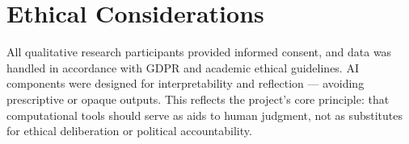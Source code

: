 \section{Ethical Considerations}

All qualitative research participants provided informed consent, and data was handled in accordance with GDPR and academic ethical guidelines. AI components were designed for interpretability and reflection — avoiding prescriptive or opaque outputs. This reflects the project's core principle: that computational tools should serve as aids to human judgment, not as substitutes for ethical deliberation or political accountability.